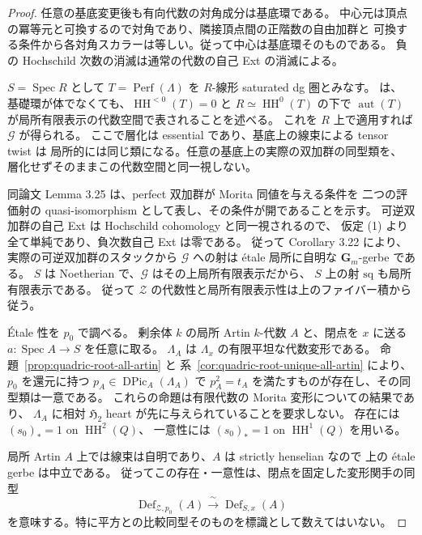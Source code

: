 \begin{proof}
任意の基底変更後も有向代数の対角成分は基底環である。
中心元は頂点の冪等元と可換するので対角であり、隣接頂点間の正階数の自由加群と
可換する条件から各対角スカラーは等しい。従って中心は基底環そのものである。
負の Hochschild 次数の消滅は通常の代数の自己 Ext の消滅による。

$S=\operatorname{Spec}R$ として
$T=\operatorname{Perf}(\Lambda)$ を $R$-線形 saturated dg 圏とみなす。
\cite[著者公開版 April 2007, Corollary 3.24]{TV2007} は、
基礎環が体でなくても、$\operatorname{HH}^{<0}(T)=0$ と
$R\simeq\operatorname{HH}^{0}(T)$ の下で
$\operatorname{aut}(T)$ が局所有限表示の代数空間で表されることを述べる。
これを $R$ 上で適用すれば $\mathcal G$ が得られる。
ここで層化は essential であり、基底上の線束による tensor twist は
局所的には同じ類になる。任意の基底上の実際の双加群の同型類を、
層化せずそのままこの代数空間と同一視しない。

同論文 Lemma 3.25 は、perfect 双加群が Morita 同値を与える条件を
二つの評価射の quasi-isomorphism として表し、その条件が開であることを示す。
可逆双加群の自己 Ext は Hochschild cohomology と同一視されるので、
仮定 (1) より全て単純であり、負次数自己 Ext は零である。
従って Corollary 3.22 により、実際の可逆双加群のスタックから
$\mathcal G$ への射は \'etale 局所に自明な $\mathbf G_m$-gerbe である。
$S$ は Noetherian で、$\mathcal G$ はその上局所有限表示だから、
$S$ 上の射 $\mathrm{sq}$ も局所有限表示である。
従って $\mathcal Z$ の代数性と局所有限表示性は上のファイバー積から従う。

\'Etale 性を $p_0$ で調べる。
剰余体 $k$ の局所 Artin $k$-代数 $A$ と、閉点を $x$ に送る
$a:\operatorname{Spec}A\to S$ を任意に取る。
$\Lambda_A$ は $\Lambda_x$ の有限平坦な代数変形である。
命題~\ref{prop:quadric-root-all-artin} と
系~\ref{cor:quadric-root-unique-all-artin} により、
$p_0$ を還元に持つ $p_A\in\operatorname{DPic}_A(\Lambda_A)$ で
$p_A^2=t_A$ を満たすものが存在し、その同型類は一意である。
これらの命題は有限代数の Morita 変形についての結果であり、
$\Lambda_A$ に相対 $\mathfrak H_2$ heart が先に与えられていることを要求しない。
存在には $(s_0)_*=1$ on $\operatorname{HH}^2(Q)$、
一意性には $(s_0)_*=1$ on $\operatorname{HH}^1(Q)$ を用いる。

局所 Artin $A$ 上では線束は自明であり、$A$ は strictly henselian なので
上の \'etale gerbe は中立である。
従ってこの存在・一意性は、閉点を固定した変形関手の同型
\[
 \operatorname{Def}_{\mathcal Z,p_0}(A)
 \xrightarrow{\ \sim\ }
 \operatorname{Def}_{S,x}(A)
\]
を意味する。特に平方との比較同型そのものを標識として数えてはいない。


\end{proof}
